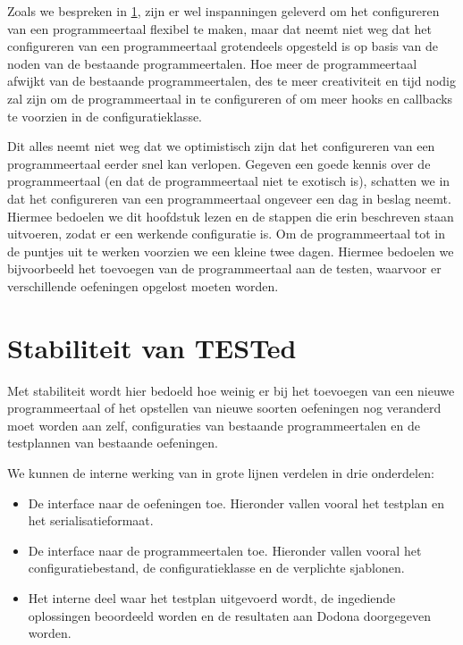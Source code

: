 Zoals we bespreken in \cref{sec:stabiliteit-van-tested}, zijn er wel inspanningen geleverd om het configureren van een programmeertaal flexibel te maken, maar dat neemt niet weg dat het configureren van een programmeertaal grotendeels opgesteld is op basis van de noden van de bestaande programmeertalen.
Hoe meer de programmeertaal afwijkt van de bestaande programmeertalen, des te meer creativiteit en tijd nodig zal zijn om de programmeertaal in \tested{} te configureren of om meer hooks en callbacks te voorzien in de configuratieklasse.

Dit alles neemt niet weg dat we optimistisch zijn dat het configureren van een programmeertaal eerder snel kan verlopen.
Gegeven een goede kennis over de programmeertaal (en dat de programmeertaal niet te exotisch is), schatten we in dat het configureren van een programmeertaal ongeveer een dag in beslag neemt.
Hiermee bedoelen we dit hoofdstuk lezen en de stappen die erin beschreven staan uitvoeren, zodat er een werkende configuratie is.
Om de programmeertaal tot in de puntjes uit te werken voorzien we een kleine twee dagen.
Hiermee bedoelen we bijvoorbeeld het toevoegen van de programmeertaal aan de testen, waarvoor er verschillende oefeningen opgelost moeten worden.

\section{Stabiliteit van TESTed}\label{sec:stabiliteit-van-tested}

Met stabiliteit wordt hier bedoeld hoe weinig er bij het toevoegen van een nieuwe programmeertaal of het opstellen van nieuwe soorten oefeningen nog veranderd moet worden aan \tested{} zelf, configuraties van bestaande programmeertalen en de testplannen van bestaande oefeningen.

We kunnen de interne werking van \tested{} in grote lijnen verdelen in drie onderdelen:

\begin{itemize}
    \item De interface naar de oefeningen toe.
    Hieronder vallen vooral het testplan en het serialisatieformaat.
    \item De interface naar de programmeertalen toe.
    Hieronder vallen vooral het configuratiebestand, de configuratieklasse en de verplichte sjablonen.
    \item Het interne deel waar het testplan uitgevoerd wordt, de ingediende oplossingen beoordeeld worden en de resultaten aan Dodona doorgegeven worden.
\end{itemize}

